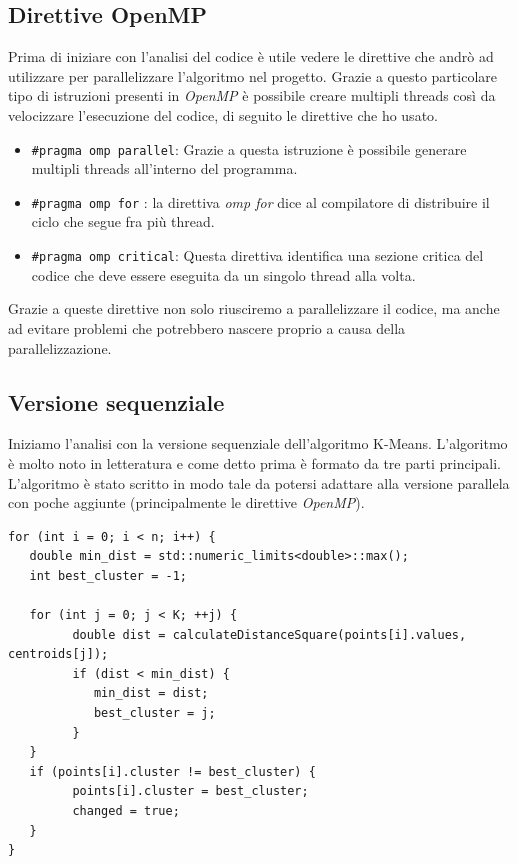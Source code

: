 \documentclass[10pt,twocolumn,letterpaper]{article}
\begin{document}
\subsection{Direttive OpenMP}
Prima di iniziare con l'analisi del codice è utile vedere le direttive che andrò ad utilizzare per parallelizzare l'algoritmo nel progetto. Grazie a questo particolare tipo di istruzioni presenti in \textit{OpenMP} è possibile creare multipli threads così da velocizzare l'esecuzione del codice, di seguito le direttive che ho usato. 
\begin{itemize}
   \item \lstinline{#pragma omp parallel}: Grazie a questa istruzione è possibile generare multipli threads all'interno del programma.
   \item \lstinline{#pragma omp for} : la direttiva \textit{omp for} dice al compilatore di distribuire il ciclo che segue fra più thread.
   \item \lstinline{#pragma omp critical}: Questa direttiva identifica una sezione critica del codice che deve essere eseguita da un singolo thread alla volta.
\end{itemize}
Grazie a queste direttive non solo riusciremo a parallelizzare il codice, ma anche ad evitare problemi che potrebbero nascere proprio a causa della parallelizzazione.

\subsection{Versione sequenziale}
Iniziamo l'analisi con la versione sequenziale dell'algoritmo K-Means. L'algoritmo è molto noto in letteratura e come detto prima è formato da tre parti principali. L'algoritmo è stato scritto in modo tale da potersi adattare alla versione parallela con poche aggiunte (principalmente le direttive \textit{OpenMP}).

\begin{lstlisting}[caption={Fase di assegnamento della versione sequenziale}, label={lst:openmp}]
for (int i = 0; i < n; i++) {  
   double min_dist = std::numeric_limits<double>::max(); 
   int best_cluster = -1; 

   for (int j = 0; j < K; ++j) { 
         double dist = calculateDistanceSquare(points[i].values, centroids[j]);  
         if (dist < min_dist) { 
            min_dist = dist;  
            best_cluster = j;    
         }
   }
   if (points[i].cluster != best_cluster) {
         points[i].cluster = best_cluster;
         changed = true; 
   }
}
\end{lstlisting}
\end{document}
